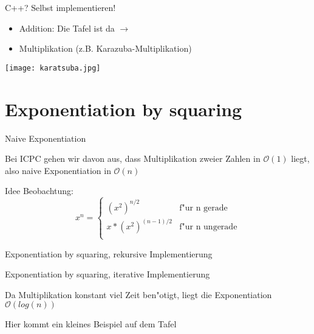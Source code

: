 \documentclass[18pt]{beamer}
\begin{document}
\begin{frame} {C++? Selbst implementieren!}
\begin {itemize}
\item Addition: Die Tafel ist da $\longrightarrow{}$
\item Multiplikation (z.B. Karazuba-Multiplikation)
\end {itemize}
\texttt{[image: karatsuba.jpg]}
\end{frame}

\section {Exponentiation by squaring}
\begin{frame} {Naive Exponentiation} 

Bei ICPC gehen wir davon aus, dass Multiplikation zweier Zahlen in $\mathcal{O}(1)$ liegt, also naive Exponentiation in $\mathcal{O}(n)$
\end{frame}

\begin{frame} {Idee}
Beobachtung:
\begin{equation}
   x^{n} =
   \begin{cases}
     (x^{2})^{n/2} & \text{f"ur n gerade} \\
      x*(x^{2})^{(n-1)/2} & \text{f"ur n ungerade} \\
   \end{cases}
\end{equation}
\end{frame}

\begin{frame} {Exponentiation by squaring, rekursive Implementierung}

\end{frame}

\begin{frame} {Exponentiation by squaring, iterative Implementierung}

Da Multiplikation konstant viel Zeit ben"otigt, liegt die Exponentiation$\mathcal{O}(log(n))$
\end{frame}


\begin{frame}{Hier kommt ein kleines Beispiel auf dem Tafel}
\end{frame}
\end{document}

